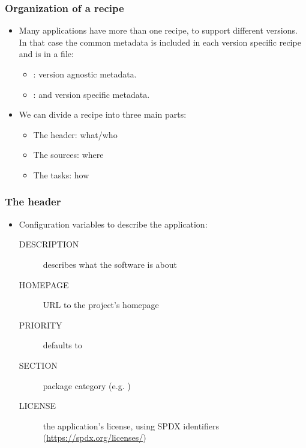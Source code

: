 \begin{frame}
  \frametitle{Organization of a recipe}
  \begin{itemize}
    \item Many applications have more than one recipe, to support
      different versions. In that case the common metadata is
      included in each version specific recipe and is in a 
      file:
      \begin{itemize}
        \item {}: version agnostic metadata.
        \item {}:  and version specific metadata.
      \end{itemize}
    \item We can divide a recipe into three main parts:
      \begin{itemize}
        \item The header: what/who
        \item The sources: where
        \item The tasks: how
      \end{itemize}
  \end{itemize}
\end{frame}

\begin{frame}
  \frametitle{The header}
  \begin{itemize}
    \item Configuration variables to describe the application:
      \begin{description}
        \item[DESCRIPTION] describes what the software is about
        \item[HOMEPAGE] URL to the project's homepage
        \item[PRIORITY] defaults to 
        \item[SECTION] package category (e.g. )
        \item[LICENSE] the application's license, using SPDX identifiers
          (\url{https://spdx.org/licenses/})
      \end{description}
  \end{itemize}
\end{frame}

